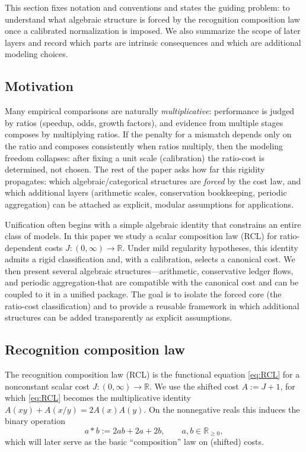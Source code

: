 \documentclass[11pt,reqno]{amsart}
\theoremstyle{plain}
\theoremstyle{definition}
\theoremstyle{remark}
\newcommand{\Jcost}{J}
\newcommand{\RR}{\mathbb{R}}
\newcommand{\1}{\mathbf{1}}
\begin{document}
This section fixes notation and conventions and states the guiding problem: to understand what algebraic structure is forced by the recognition composition law once a calibrated normalization is imposed. We also summarize the scope of later layers and record which parts are intrinsic consequences and which are additional modeling choices.

\subsection*{Motivation}
Many empirical comparisons are naturally \emph{multiplicative}: performance is judged by ratios (speedup, odds, growth factors),
and evidence from multiple stages composes by multiplying ratios.
If the penalty for a mismatch depends only on the ratio and composes consistently when ratios multiply,
then the modeling freedom collapses: after fixing a unit scale (calibration) the ratio-cost is determined, not chosen.
The rest of the paper asks how far this rigidity propagates:
which algebraic/categorical structures are \emph{forced} by the cost law, and which additional layers (arithmetic scales, conservation bookkeeping,
periodic aggregation) can be attached as explicit, modular assumptions for applications.

Unification often begins with a simple algebraic identity that constrains an entire class of models.
In this paper we study a scalar composition law (RCL) for ratio-dependent costs $J:(0,\infty)\to\RR$.
Under mild regularity hypotheses, this identity admits a rigid classification and, with a calibration, selects a canonical cost.
We then present several algebraic structures---arithmetic, conservative ledger flows, and periodic aggregation-that are compatible with the canonical cost and can be coupled to it in a unified package.
The goal is to isolate the forced core (the ratio-cost classification) and to provide a reusable framework in which additional structures can be added transparently as explicit assumptions.

\subsection{Recognition composition law}
The recognition composition law (RCL) is the functional equation \eqref{eq:RCL} for a nonconstant scalar cost $\Jcost:(0,\infty)\to\RR$.
We use the shifted cost $A:=\Jcost+1$, for which \eqref{eq:RCL} becomes the multiplicative identity $A(xy)+A(x/y)=2A(x)A(y)$.
On the nonnegative reals this induces the binary operation
\[
a\ast b:=2ab+2a+2b,
\qquad a,b\in\RR_{\ge0},
\]
which will later serve as the basic ``composition'' law on (shifted) costs.
\end{document}
